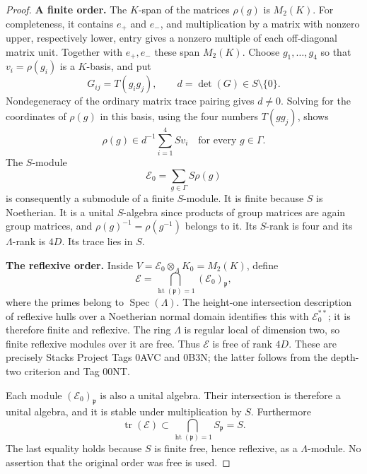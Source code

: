 \begin{proof}
\noindent\textbf{A finite order.}
The \(K\)-span of the matrices \(\rho(g)\) is \(M_2(K)\).
For completeness, it contains \(e_+\) and \(e_-\), and multiplication
by a matrix with nonzero upper, respectively lower, entry gives a
nonzero multiple of each off-diagonal matrix unit.
Together with \(e_+,e_-\) these span \(M_2(K)\).
Choose \(g_1,\ldots,g_4\) so that
\(v_i=\rho(g_i)\) is a \(K\)-basis, and put
\[
 G_{ij}=T(g_i g_j),\qquad d=\det(G)\in S\setminus\{0\}.
 \tag{G85.5}
\]
Nondegeneracy of the ordinary matrix trace pairing gives \(d\ne0\).
Solving for the coordinates of \(\rho(g)\) in this basis, using the
four numbers \(T(gg_j)\), shows
\[
 \rho(g)\in d^{-1}\sum_{i=1}^4 S v_i
 \quad\text{for every }g\in\Gamma.
\]
The \(S\)-module
\[
 \mathcal E_0=\sum_{g\in\Gamma}S\rho(g)
 \tag{G85.6}
\]
is consequently a submodule of a finite \(S\)-module.
It is finite because \(S\) is Noetherian.
It is a unital \(S\)-algebra since products of group matrices are
again group matrices, and \(\rho(g)^{-1}=\rho(g^{-1})\) belongs to it.
Its \(S\)-rank is four and its \(\Lambda\)-rank is \(4D\).
Its trace lies in \(S\).

\noindent\textbf{The reflexive order.}
Inside
\(V=\mathcal E_0\otimes_\Lambda K_0=M_2(K)\), define
\[
 \mathcal E=
 \bigcap_{\operatorname{ht}(\mathfrak p)=1}
       (\mathcal E_0)_{\mathfrak p},
 \tag{G85.7}
\]
where the primes belong to \(\operatorname{Spec}(\Lambda)\).
The height-one intersection description of reflexive hulls over a
Noetherian normal domain identifies this with
\(\mathcal E_0^{**}\); it is therefore finite and reflexive.
The ring \(\Lambda\) is regular local of dimension two, so finite
reflexive modules over it are free. Thus \(\mathcal E\) is free of
rank \(4D\).
These are precisely Stacks Project Tags 0AVC and 0B3N;
the latter follows from the depth-two criterion and Tag 00NT.

Each module \((\mathcal E_0)_{\mathfrak p}\) is also a unital algebra.
Their intersection is therefore a unital algebra, and it is stable
under multiplication by \(S\).
Furthermore
\[
 \operatorname{tr}(\mathcal E)
 \subset
 \bigcap_{\operatorname{ht}(\mathfrak p)=1} S_{\mathfrak p}
 =S.
 \tag{G85.8}
\]
The last equality holds because \(S\) is finite free, hence reflexive,
as a \(\Lambda\)-module. No assertion that the original order was
free is used.


\end{proof}
